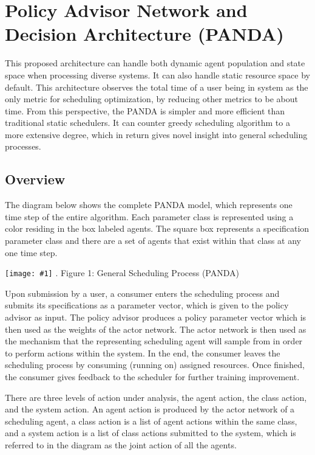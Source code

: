 \documentclass{article}
\theoremstyle{definition}
\theoremstyle{remark}
\newcommand{\addpic}[1]{\texttt{[image: \#1]}}
\begin{document}
	\section{Policy Advisor Network and Decision Architecture (PANDA)}

	This proposed architecture can handle both dynamic agent population and state space when processing diverse systems. It can also handle static resource space by default. This architecture observes the total time of a user being in system as the only metric for scheduling optimization, by reducing other metrics to be about time. From this perspective, the PANDA is simpler and more efficient than traditional static schedulers. It can counter greedy scheduling algorithm to a more extensive degree, which in return gives novel insight into general scheduling processes.

		\subsection{Overview}

		The diagram below shows the complete PANDA model, which represents one time step of the entire algorithm. Each parameter class is represented using a color residing in the box labeled agents. The square box represents a specification parameter class and there are a set of agents that exist within that class at any one time step.
	
	 	  
	 	\addpic{figures/general_diagram_2}
	 	.\hspace{2cm}  Figure 1:  General Scheduling Process (PANDA)			
		

		Upon submission by a user, a consumer enters the scheduling process and submits its specifications as a parameter vector, which is given to the policy advisor as input. The policy advisor produces a policy parameter vector which is then used as the weights of the actor network. The actor network is then used as the mechanism that the representing scheduling agent will sample from in order to perform actions within the system. In the end, the consumer leaves the scheduling process by consuming (running on) assigned resources. Once finished, the consumer gives feedback to the scheduler for further training improvement.

		There are three levels of action under analysis, the agent action, the class action, and the system action. An agent action is produced by the actor network of a scheduling agent, a class action is a list of agent actions within the same class, and a system action is a list of class actions submitted to the system, which is referred to in the diagram as the joint action of all the agents.
\end{document}
